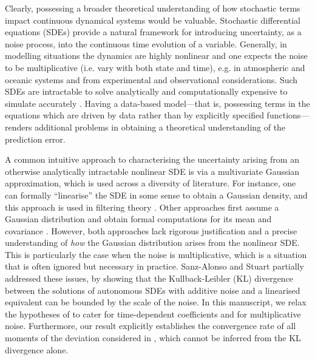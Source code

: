 Clearly, possessing a broader theoretical understanding of how stochastic terms impact continuous dynamical systems would be valuable.  
Stochastic differential equations (SDEs) provide a natural framework for introducing uncertainty, as a noise process, into the continuous time evolution of a variable.
Generally, in modelling situations the dynamics are highly nonlinear and one expects the noise to be multiplicative (i.e. vary with both state and time), e.g. in atmospheric \cite{Sura_2003_StochasticAnalysisSouthern, SuraEtAl_2005_MultiplicativeNoiseNonGaussianity} and oceanic \cite{KamenkovichEtAl_2015_PropertiesOriginsAnisotropic} systems and from experimental and observational considerations.
Such SDEs are intractable to solve analytically \cite{Oksendal_2003_StochasticDifferentialEquations} and computationally expensive to simulate accurately \cite{MoraEtAl_2017_StableNumericalScheme}.
Having a data-based model---that is, possessing terms in the equations which are driven by data rather than by explicitly specified functions---renders additional problems in obtaining a theoretical understanding of the prediction error.  

A common intuitive approach to characterising the uncertainty arising from an otherwise analytically intractable nonlinear SDE is via a multivariate Gaussian approximation, which is used across a diversity of literature. 
For instance, one can formally ``linearise'' the SDE in some sense to obtain a Gaussian density, and this approach is used in filtering theory \cite{Jazwinski_2014_StochasticProcessesFiltering}.
Other approaches first assume a Gaussian distribution and obtain formal computations for its mean and covariance \cite{SarkkaSolin_2019_AppliedStochasticDifferential}.
However, both approaches lack rigorous justification and a precise understanding of \emph{how} the Gaussian distribution arises from the nonlinear SDE.
This is particularly the case when the noise is multiplicative, which is a situation that is often ignored but necessary in practice.
Sanz-Alonso and Stuart \cite{Sanz-AlonsoStuart_2017_GaussianApproximationsSmall} partially addressed these issues, by showing that the Kullback-Leibler (KL) divergence between the solutions of autonomous SDEs with additive noise and a linearised equivalent can be bounded by the scale of the noise. In this manuscript, we relax the hypotheses of \cite{Sanz-AlonsoStuart_2017_GaussianApproximationsSmall} to cater for time-dependent coefficients and for multiplicative noise. Furthermore, our result explicitly establishes the convergence rate of all moments of the deviation considered in \cite{Sanz-AlonsoStuart_2017_GaussianApproximationsSmall}, which cannot be inferred from the KL divergence alone.


